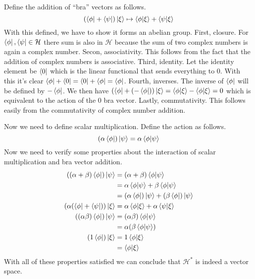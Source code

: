 \documentclass[boxes,pages]{homework}
\makeatletter
\numberwithin{@problem}{section}
\makeatother
\begin{document}
\begin{solution}
	Define the addition of ``bra'' vectors as follows.
	\begin{equation*}
		\qty(\bra{\phi} + \bra{\psi})\ket{\xi} \mapsto \braket{\phi}{\xi} + \braket{\psi}{\xi}
	\end{equation*}
	With this defined, we have to show it forms an abelian group. First, closure. For $\bra{\phi}, \bra{\psi} \in\mathcal{H}$ there sum is also in $\mathcal{H}$ because the sum of two complex numbers is again a complex number. Secon, associativity. This follows from the fact that the addition of complex numbers is associative. Third, identity. Let the identity element be $\bra{0}$ which is the linear functional that sends everything to 0. With this it's clear $\bra{\phi} + \bra{0} = \bra{0} + \bra{\phi} = \bra{\phi}$. Fourth, inverses. The inverse of $\bra{\phi}$ will be defined by $-\bra{\phi}$. We then have $\qty(\bra{\phi} + (-\bra{\phi}))\ket{\xi} = \braket{\phi}{\xi} - \braket{\phi}{\xi} = 0$ which is equivalent to the action of the 0 bra vector. Lastly, commutativity. This follows easily from the commutativity of complex number addition.

	Now we need to define scalar multiplication. Define the action as follows.
	\begin{equation*}
		\qty(\alpha\bra{\phi})\ket{\psi} = \alpha\braket{\phi}{\psi}
	\end{equation*}
	Now we need to verify some properties about the interaction of scalar multiplication and bra vector addition.
	\begin{align*}
		\qty((\alpha + \beta)\bra{\phi})\ket{\psi} & = (\alpha + \beta)\braket{\phi}{\psi}                        \\
		                                           & = \alpha\braket{\phi}{\psi} + \beta\braket{\phi}{\psi}       \\
		                                           & = (\alpha\bra{\phi})\ket{\psi} + (\beta\bra{\phi})\ket{\psi} \\
		(\alpha(\bra{\phi} + \bra{\psi}))\ket{\xi} & = \alpha \braket{\phi}{\xi} + \alpha\braket{\psi}{\xi}       \\
		((\alpha\beta)\bra{\phi})\ket{\psi}        & = (\alpha\beta)\braket{\phi}{\psi}                           \\
		                                           & = \alpha(\beta\braket{\phi}{\psi})                           \\
		(1\bra{\phi})\ket{\xi}                     & = 1\braket{\phi}{\xi}                                        \\
		                                           & = \braket{\phi}{\xi}
	\end{align*}
	With all of these properties satisfied we can conclude that $\mathcal{H}^*$ is indeed a vector space.
\end{solution}
\end{document}
